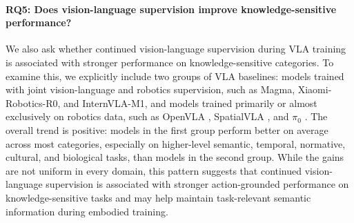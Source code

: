 \documentclass[11pt]{article}
\begin{document}
\begin{table}[t]
\centering
\footnotesize
\setlength{\tabcolsep}{4pt}
\renewcommand{\arraystretch}{0.95}

\caption{Averaged probing-based retention metrics by model. VLM and Action report the maximum probing accuracies over backbone and Action Part layers, respectively.}
\label{tab:cnr_car}
\end{table}

\paragraph{RQ5: Does vision-language supervision improve knowledge-sensitive performance?}
We also ask whether continued vision-language supervision during VLA training is associated with stronger performance on knowledge-sensitive categories. To examine this, we explicitly include two groups of VLA baselines: models trained with joint vision-language and robotics supervision, such as Magma, Xiaomi-Robotics-R0, and InternVLA-M1, and models trained primarily or almost exclusively on robotics data, such as OpenVLA \citep{openvla}, SpatialVLA \citep{spatialvla}, and $\pi_0$ \citep{pi0}. The overall trend is positive: models in the first group perform better on average across most categories, especially on higher-level semantic, temporal, normative, cultural, and biological tasks, than models in the second group. While the gains are not uniform in every domain, this pattern suggests that continued vision-language supervision is associated with stronger action-grounded performance on knowledge-sensitive tasks and may help maintain task-relevant semantic information during embodied training.
\end{document}
